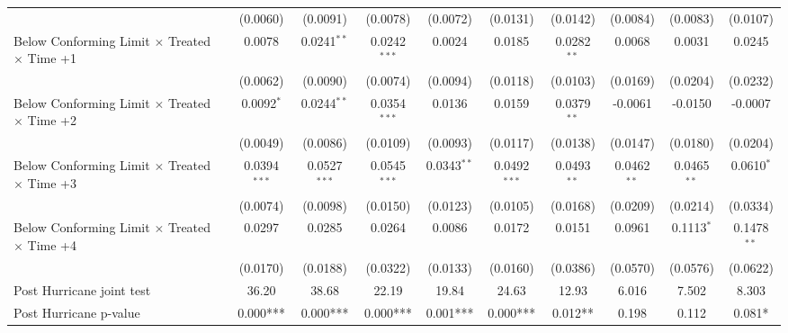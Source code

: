 \begin{tabular}{lccccccccc}
                                                              & (0.0060)       & (0.0091)       & (0.0078)       & (0.0072)      & (0.0131)       & (0.0142)      & (0.0084)      & (0.0083)      & (0.0107)\\   
   Below Conforming Limit $\times$ Treated $\times$ Time +1   & 0.0078         & 0.0241$^{**}$  & 0.0242$^{***}$ & 0.0024        & 0.0185         & 0.0282$^{**}$ & 0.0068        & 0.0031        & 0.0245\\   
                                                              & (0.0062)       & (0.0090)       & (0.0074)       & (0.0094)      & (0.0118)       & (0.0103)      & (0.0169)      & (0.0204)      & (0.0232)\\   
   Below Conforming Limit $\times$ Treated $\times$ Time +2   & 0.0092$^{*}$   & 0.0244$^{**}$  & 0.0354$^{***}$ & 0.0136        & 0.0159         & 0.0379$^{**}$ & -0.0061       & -0.0150       & -0.0007\\   
                                                              & (0.0049)       & (0.0086)       & (0.0109)       & (0.0093)      & (0.0117)       & (0.0138)      & (0.0147)      & (0.0180)      & (0.0204)\\   
   Below Conforming Limit $\times$ Treated $\times$ Time +3   & 0.0394$^{***}$ & 0.0527$^{***}$ & 0.0545$^{***}$ & 0.0343$^{**}$ & 0.0492$^{***}$ & 0.0493$^{**}$ & 0.0462$^{**}$ & 0.0465$^{**}$ & 0.0610$^{*}$\\   
                                                              & (0.0074)       & (0.0098)       & (0.0150)       & (0.0123)      & (0.0105)       & (0.0168)      & (0.0209)      & (0.0214)      & (0.0334)\\   
   Below Conforming Limit $\times$ Treated $\times$ Time +4   & 0.0297         & 0.0285         & 0.0264         & 0.0086        & 0.0172         & 0.0151        & 0.0961        & 0.1113$^{*}$  & 0.1478$^{**}$\\   
                                                              & (0.0170)       & (0.0188)       & (0.0322)       & (0.0133)      & (0.0160)       & (0.0386)      & (0.0570)      & (0.0576)      & (0.0622)\\   
   Post Hurricane joint test                                  & 36.20          & 38.68          & 22.19          & 19.84         & 24.63          & 12.93         & 6.016         & 7.502         & 8.303\\  
   Post Hurricane p-value                                     & 0.000***       & 0.000***       & 0.000***       & 0.001***      & 0.000***       & 0.012**       & 0.198         & 0.112         & 0.081*\\  

\end{tabular}
